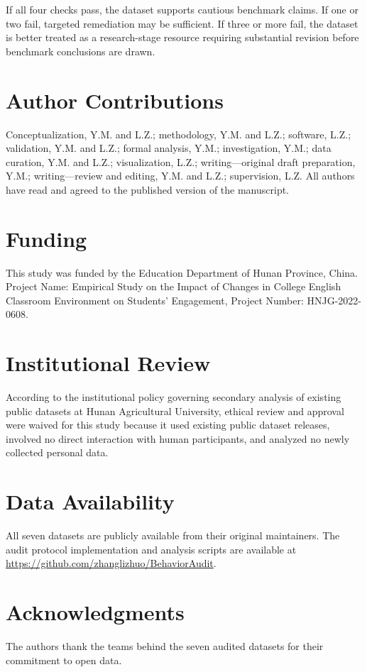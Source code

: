 If all four checks pass, the dataset supports cautious benchmark claims. If one or two fail, targeted remediation may be sufficient. If three or more fail, the dataset is better treated as a research-stage resource requiring substantial revision before benchmark conclusions are drawn.

\section*{Author Contributions}
Conceptualization, Y.M. and L.Z.; methodology, Y.M. and L.Z.; software, L.Z.;
validation, Y.M. and L.Z.; formal analysis, Y.M.; investigation, Y.M.; data curation,
Y.M. and L.Z.; visualization, L.Z.; writing---original draft preparation, Y.M.;
writing---review and editing, Y.M. and L.Z.; supervision, L.Z. All authors have
read and agreed to the published version of the manuscript.

\section*{Funding}
This study was funded by the Education Department of Hunan Province, China.
Project Name: Empirical Study on the Impact of Changes in College English Classroom
Environment on Students' Engagement, Project Number: HNJG-2022-0608.

\section*{Institutional Review}
According to the institutional policy governing secondary analysis of existing public
datasets at Hunan Agricultural University, ethical review and approval were waived for
this study because it used existing public dataset releases, involved no direct
interaction with human participants, and analyzed no newly collected personal data.

\section*{Data Availability}
All seven datasets are publicly available from their original maintainers. The audit
protocol implementation and analysis scripts are available at
\url{https://github.com/zhanglizhuo/BehaviorAudit}.

\section*{Acknowledgments}
The authors thank the teams behind the seven audited datasets for their commitment
to open data.


